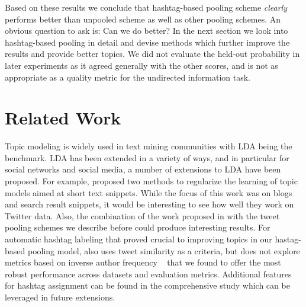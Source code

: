 \documentclass{sig-alternate}
\begin{document}
Based on these results we conclude that hashtag-based pooling scheme
\emph{clearly} performs better than unpooled scheme as well as other
pooling schemes. An obvious question to ask is: Can we do better? In
the next section we look into hashtag-based pooling in detail and
devise methods which further improve the results and provide better
topics.  We did not evaluate the held-out probability in later
experiments as it agreed generally with the other scores,
and is not as appropriate  as a quality metric for the
undirected information task.


\section{Related Work}

\label{sec:related_work}
Topic modeling is widely used in text mining communities with LDA
being the benchmark.  LDA has been extended in a variety of ways, and
in particular for social networks and social media, a number of
extensions to LDA have been proposed.  For example, \cite{newman11}
proposed two methods to regularize the learning of topic models aimed
at short text snippets. While the focus of this work was on blogs and
search result snippets, it would be interesting to see how well they
work on Twitter data.  Also, the combination of the work proposed in
\cite{newman11} with the tweet pooling schemes we describe before
could produce interesting results. For automatic
 hashtag labeling that proved crucial to improving topics in our hastag-based pooling model, \cite{zangerle2011recommending} also uses tweet similarity as a
criteria, but does not explore metrics based on inverse author
frequency ~\cite{iaf} that we found to offer the most robust
performance across datasets and evaluation metrics. Additional features  for hashtag assignment can be found in the comprehensive study \cite{yang2012www} which can be leveraged in future extensions.
\end{document}
